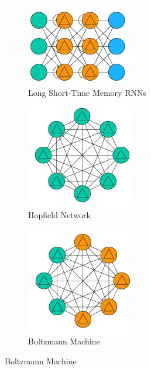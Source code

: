\begin{figure}[!ht]
	\begin{subfigure}[h]{0.3\linewidth}
		\centering
		\caption{Long Short-Time Memory RNNs}
		\label{fig:lstm}
		\includegraphics[width=0.6\linewidth]{img/pop_arch/lstm.jpg}
	\end{subfigure}
	\hspace{0.5cm}
	\begin{subfigure}[h]{0.3\linewidth}
		\centering
		\caption{Hopfield Network}
		\label{fig:hopfield}
		\includegraphics[width=0.6\linewidth]{img/pop_arch/hopfield.jpg}
	\end{subfigure}
	\hspace{0.5cm}
	\begin{subfigure}[h]{0.3\linewidth}
		\centering
		\caption{Boltzmann Machine}
		\label{fig:boltzmann}
		\includegraphics[width=0.6\linewidth]{img/pop_arch/boltzmann.jpg}
	\end{subfigure}
\end{figure}

